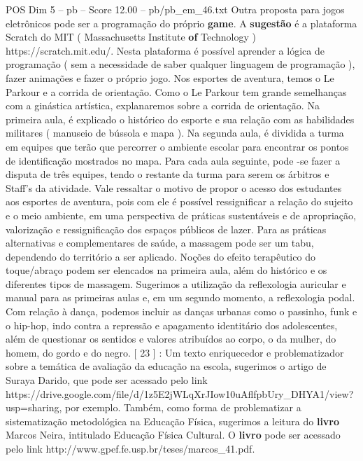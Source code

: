 \begin{textsample}{POS Dim 5 – pb – Score 12.00 – pb/pb\_em\_46.txt}
Outra proposta para jogos eletrônicos pode ser a programação do próprio \textbf{game}.
A \textbf{sugestão} é a plataforma Scratch do MIT ( Massachusetts Institute \textbf{of} Technology ) https://scratch.mit.edu/.
Nesta plataforma é possível aprender a lógica de programação ( sem a necessidade de saber qualquer linguagem de programação ), fazer animações e fazer o próprio jogo.
Nos esportes de aventura, temos o Le Parkour e a corrida de orientação.
Como o Le Parkour tem grande semelhanças com a ginástica artística, explanaremos sobre a corrida de orientação.
Na primeira aula, é explicado o histórico do esporte e sua relação com as habilidades militares ( manuseio de bússola e mapa ).
Na segunda aula, é dividida a turma em equipes que terão que percorrer o ambiente escolar para encontrar os pontos de identificação mostrados no mapa.
Para cada aula seguinte, pode -se fazer a disputa de três equipes, tendo o restante da turma para serem os árbitros e Staff’s da atividade.
Vale ressaltar o motivo de propor o acesso dos estudantes aos esportes de aventura, pois com ele é possível ressignificar a relação do sujeito e o meio ambiente, em uma perspectiva de práticas sustentáveis e de apropriação, valorização e ressignificação dos espaços públicos de lazer.
Para as práticas alternativas e complementares de saúde, a massagem pode ser um tabu, dependendo do território a ser aplicado.
Noções do efeito terapêutico do toque/abraço podem ser elencados na primeira aula, além do histórico e os diferentes tipos de massagem.
Sugerimos a utilização da reflexologia auricular e manual para as primeiras aulas e, em um segundo momento, a reflexologia podal.
Com relação à dança, podemos incluir as danças urbanas como o passinho, funk e o hip-hop, indo contra a repressão e apagamento identitário dos adolescentes, além de questionar os sentidos e valores atribuídos ao corpo, o da mulher, do homem, do gordo e do negro. [ 23 ] : Um texto enriquecedor e problematizador sobre a temática de avaliação da educação na escola, sugerimos o artigo de Suraya Darido, que pode ser acessado pelo link https://drive.google.com/file/d/1z5E2jWLqXrJIow10uAflfpbUry\_DHYA1/view? usp=sharing, por exemplo.
Também, como forma de problematizar a sistematização metodológica na Educação Física, sugerimos a leitura do \textbf{livro} Marcos Neira, intitulado Educação Física Cultural.
O \textbf{livro} pode ser acessado pelo link http://www.gpef.fe.usp.br/teses/marcos\_41.pdf.

\end{textsample}

